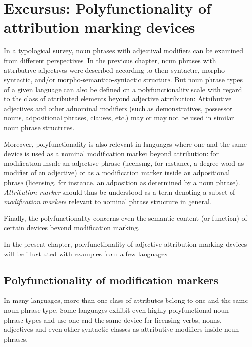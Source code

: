 %
%

%

\chapter[Polyfunctionality]{Excursus: Polyfunctionality of attribution marking devices} \label{polyfunctionality}
In a typological survey, noun phrases with adjectival modifiers can be examined from different perspectives. In the previous chapter, noun phrases with attributive adjectives were described according to their syntactic, morpho-syntactic, and/or morpho-semantico-syntactic structure. But noun phrase types of a given language can also be defined on a polyfunctionality scale with regard to the class of attributed elements beyond adjective attribution: Attributive adjectives and other adnominal modifiers (such as demonstratives, possessor nouns, adpositional phrases, clauses, etc.) may or may not be used in similar noun phrase structures.

Moreover, polyfunctionality is also relevant in languages where one and the same device is used as a nominal modification marker beyond attribution: for modification inside an adjective phrase (licensing, for instance, a degree word as modifier of an adjective) or as a modification marker inside an adpositional phrase (licensing, for instance, an adposition as determined by a noun phrase). \textit{Attribution marker} should thus be understood as a term denoting a subset of \textit{modification markers} relevant to nominal phrase structure in general.

Finally, the polyfunctionality concerns even the semantic content (or function) of certain devices beyond modification marking. 

In the present chapter, polyfunctionality of adjective attribution marking devices will be illustrated with examples from a few languages.

\section{Polyfunctionality of modification markers}
In many languages, more than one class of attributes belong to one and the same noun phrase type. Some languages exhibit even highly polyfunctional noun phrase types and use one and the same device for licensing verbs, nouns, adjectives and even other syntactic classes as attributive modifiers inside noun phrases.

